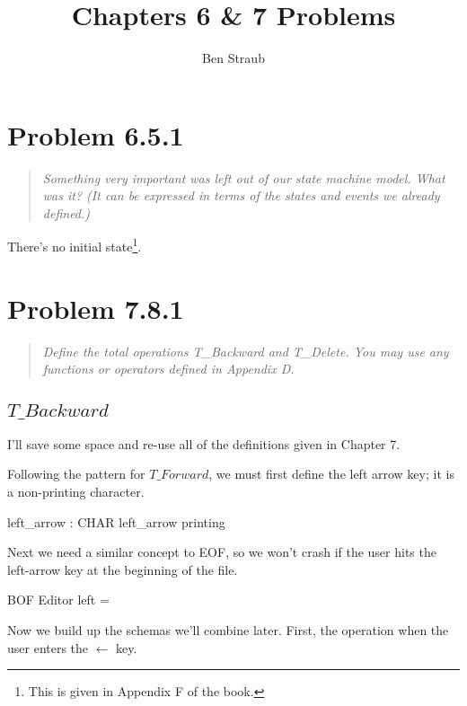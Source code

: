 \documentclass[11pt]{article}
\begin{document}
\title{Chapters 6 \& 7 Problems}
\author{Ben Straub}
\maketitle

\section{Problem 6.5.1}
\begin{quote} \textit{
    Something very important was left out of our state machine model. What was it? (It can be
    expressed in terms of the states and events we already defined.)
  } \end{quote}

There's no initial state\footnote{This is given in Appendix F of the book.}.

\section{Problem 7.8.1}

\begin{quote}
  \textit{Define the total operations T\_Backward and T\_Delete.  You may use any functions or
    operators defined in Appendix D. }
\end{quote}

\subsection{$T\_Backward$}

I'll save some space and re-use all of the definitions given in Chapter 7.

Following the pattern for $T\_Forward$, we must first define the left arrow key; it is a
non-printing character.

\begin{axdef}
  left\_arrow : CHAR
  \where
  left\_arrow \notin printing
\end{axdef}

Next we need a similar concept to EOF, so we won't crash if the user hits the left-arrow key at the
beginning of the file.

\begin{schema}{BOF}
  Editor
  \where
  left = \langle \rangle
\end{schema}

Now we build up the schemas we'll combine later. First, the operation when the user enters the
$\leftarrow$ key.
\end{document}

